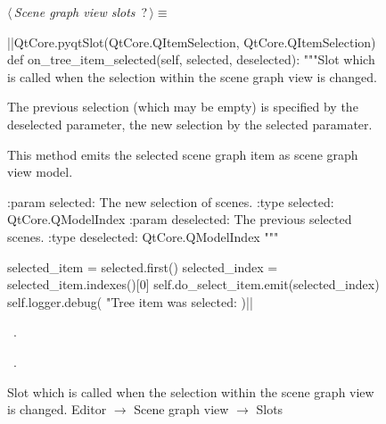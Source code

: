 \documentclass[%
    a4paper,    %
    justified,  %
    nobib,      %
    openany     %
]{tufte-book}
\makeatletter
\renewcommand{\label}[1]{\@tufte@label{##1}}%
\makeatother
\begin{document}
\begin{figure}
\begin{flushleft} \small
\begin{minipage}{\linewidth}\label{scrap43}\raggedright\small
{} $\langle\,${\itshape Scene graph view slots}\nobreak\ {\footnotesize {?}}$\,\rangle\equiv$
\vspace{-1ex}
\begin{pythoncode}
|\normalfont{}\fontfamily{}|QtCore.pyqtSlot(QtCore.QItemSelection, QtCore.QItemSelection)
def on_tree_item_selected(self, selected, deselected):
    """Slot which is called when the selection within the scene
    graph view is changed.

    The previous selection (which may be empty) is specified by
    the deselected parameter, the new selection by the selected
    paramater.

    This method emits the selected scene graph item as scene
    graph view model.

    :param selected: The new selection of scenes.
    :type  selected: QtCore.QModelIndex
    :param deselected: The previous selected scenes.
    :type  deselected: QtCore.QModelIndex
    """

    selected_item = selected.first()
    selected_index = selected_item.indexes()[0]
    self.do_select_item.emit(selected_index)
    self.logger.debug(
        "Tree item was selected: %
    )|\NWsep|
\end{pythoncode}
\vspace{1.5ex}
\footnotesize
\begin{list}{}{\setlength{\itemsep}{-\parsep}\setlength{\itemindent}{-\leftmargin}}
\item \NWtxtMacroDefBy\ .
\item \NWtxtMacroRefIn\ .

\item{}
\end{list}
\end{minipage}\vspace{4ex}
\end{flushleft}
\caption{Slot which is called when the selection within the scene graph view is
  changed.
  \newline{}\newline{}Editor $\rightarrow$ Scene graph view
  $\rightarrow$ Slots}
\label{editor:lst:scene-graph-view:slots:on-tree-item-selected}
\end{figure}
\end{document}
